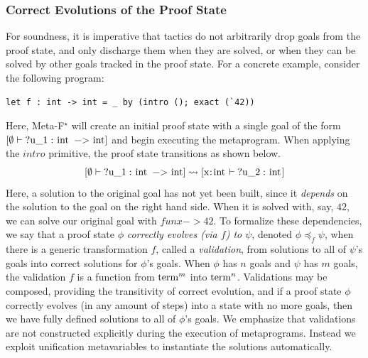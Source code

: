 \documentclass[runningheads]{llncs}
\newcommand{\kw}[1]{\text{\ls|#1|}}
\newcommand\Goal[3]{\mbox{\ensuremath{#1 \vdash \kw{#2} : \kw{#3}}\xspace}}
\newcommand\metafstar{Meta-F$^\star$\xspace}
\newcommand{\comm}[3]{\ifcheckpagebudget\else\ifdraft{{\color{#1}[#2: #3]}}\fi\fi}
\newcommand{\cpc}[1]{\comm{brown}{Cl\'ement}{#1}}
\begin{document}
\subsubsection{Correct Evolutions of the Proof State}

For soundness, it is imperative that tactics do not
arbitrarily drop goals from the proof state,
and only discharge them when they are solved,
or when they can be solved by other goals tracked in the proof state.
%
For a concrete example, consider the following program:
%
\begin{lstlisting}
let f : int -> int = _ by (intro (); exact (`42))
\end{lstlisting}
%
Here, \metafstar will create an initial proof state with
a single goal of the form
$\left[\Goal{\emptyset}{?u_1}{int -> int}\right]$ and
begin executing the metaprogram.
%
When applying the \ls$intro$ primitive, the proof state
transitions as shown below.
%
%
\[
    \left[ \Goal{\emptyset}{?u_1}{int -> int} \right]
%
    \leadsto
%
    \left[ \Goal{\kw{x:int}}{?u_2}{int} \right]
\]
%
\let\evol\preceq
%
Here, a solution to the original goal
has not yet been built, since it
\emph{depends} on the solution to the goal on the right hand side.
%
When it is solved with, say, \ls$42$, we can solve our original goal
with \ls$fun x -> 42$.
To formalize these dependencies, we say that a proof state $\phi$
\emph{correctly evolves (via $f$) to $\psi$}, denoted $\phi \evol_f \psi$,
when there is a generic transformation $f$, called a \emph{validation}, from solutions to all of $\psi$'s
goals into correct solutions for $\phi$'s goals.
%
When $\phi$ has $n$ goals and $\psi$ has $m$ goals, the
validation $f$ is a function from $\kw{term}^m$ into $\kw{term}^n$.
%
Validations may be composed, providing the
transitivity of correct evolution, and if a proof state $\phi$
correctly evolves (in any amount of steps) into a state with no more goals, then we have fully
defined solutions to all of $\phi$'s goals.
%
We emphasize that validations are not constructed
explicitly during the execution of metaprograms.
%
Instead we exploit unification metavariables to instantiate the
solutions automatically.
\end{document}

